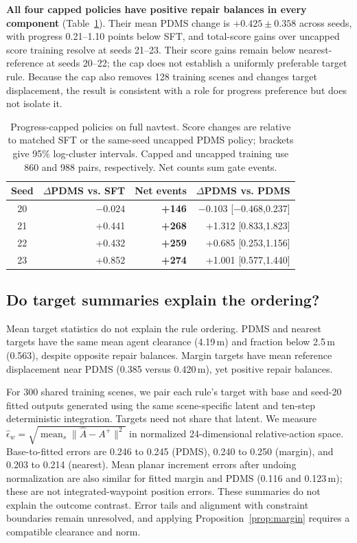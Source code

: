 \documentclass[letterpaper,10pt,conference]{ieeeconf}
\begin{document}
\textbf{All four capped policies have positive repair balances in every component} (Table~\ref{tab:capped}). Their mean PDMS change is $+0.425\pm0.358$ across seeds, with progress 0.21--1.10 points below SFT, and total-score gains over uncapped score training resolve at seeds 21--23. Their score gains remain below nearest-reference at seeds 20--22; the cap does not establish a uniformly preferable target rule. Because the cap also removes 128 training scenes and changes target displacement, the result is consistent with a role for progress preference but does not isolate it.

\begin{table}[t]
\centering\small
\caption{Progress-capped policies on full navtest. Score changes are relative to matched SFT or the same-seed uncapped PDMS policy; brackets give 95\% log-cluster intervals. Capped and uncapped training use 860 and 988 pairs, respectively. Net counts sum gate events.}
\label{tab:capped}
\setlength{\tabcolsep}{3pt}
\begin{tabular}{@{}crrr@{}}
\toprule
Seed & $\Delta$PDMS vs. SFT & Net events & $\Delta$PDMS vs. PDMS \\
\midrule
20 & $-0.024$ & \textbf{+146} & $-0.103$ [$-0.468$,0.237] \\
21 & +0.441 & \textbf{+268} & +1.312 [0.833,1.823] \\
22 & +0.432 & \textbf{+259} & +0.685 [0.253,1.156] \\
23 & +0.852 & \textbf{+274} & +1.001 [0.577,1.440] \\
\bottomrule
\end{tabular}
\end{table}

\subsection{Do target summaries explain the ordering?}\label{sec:targetstats}
Mean target statistics do not explain the rule ordering. PDMS and nearest targets have the same mean agent clearance (4.19\,m) and fraction below 2.5\,m (0.563), despite opposite repair balances. Margin targets have mean reference displacement near PDMS (0.385 versus 0.420\,m), yet positive repair balances.

For 300 shared training scenes, we pair each rule's target with base and seed-20 fitted outputs generated using the same scene-specific latent and ten-step deterministic integration. Targets need not share that latent. We measure $\hat\epsilon_w=\sqrt{\operatorname{mean}_s\|\widehat A-A^+\|^2}$ in normalized 24-dimensional relative-action space. Base-to-fitted errors are 0.246 to 0.245 (PDMS), 0.240 to 0.250 (margin), and 0.203 to 0.214 (nearest). Mean planar increment errors after undoing normalization are also similar for fitted margin and PDMS (0.116 and 0.123\,m); these are not integrated-waypoint position errors. These summaries do not explain the outcome contrast. Error tails and alignment with constraint boundaries remain unresolved, and applying Proposition~\ref{prop:margin} requires a compatible clearance and norm.
\end{document}
